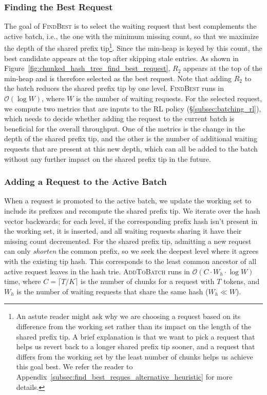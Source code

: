 \vspace{-5pt}

\subsubsection*{Finding the Best Request}
The goal of \textsc{FindBest} is to select the waiting request that best complements the active batch, i.e., the one with the minimum missing count, so that we maximize the depth of the shared prefix tip\footnote{An astute reader might ask why we are choosing a request based on its difference from the working set rather than its impact on the length of the shared prefix tip. A brief explanation is that we want to pick a request that helps us revert back to a longer shared prefix tip sooner, and a request that differs from the working set by the least number of chunks helps us achieve this goal best. We refer the reader to Appendix~\ref{subsec:find_best_reques_alternative_heuristic} for more details.}. Since the min-heap is keyed by this count, the best candidate appears at the top after skipping stale entries. As shown in Figure~\ref{fig:chunked_hash_tree_find_best_request}, $R_2$ appears at the top of the min-heap and is therefore selected as the best request. Note that adding $R_2$ to the batch reduces the shared prefix tip by one level. \textsc{FindBest} runs in $\mathcal{O}(\log W)$, where $W$ is the number of waiting requests. For the selected request, we compute two metrics that are inputs to the RL policy (\S\ref{subsec:batching_rl}), which needs to decide whether adding the request to the current batch is beneficial for the overall throughput. One of the metrics is the change in the depth of the shared prefix tip, and the other is the number of additional waiting requests that are present at this new depth, which can all be added to the batch without any further impact on the shared prefix tip in the future. 

\vspace{-5pt}

\subsubsection*{Adding a Request to the Active Batch} 
When a request is promoted to the active batch, we update the working set to include its prefixes and recompute the shared prefix tip. We iterate over the hash vector backwards; for each level, if the corresponding prefix hash isn't present in the working set, it is inserted, and all waiting requests sharing it have their missing count decremented. For the shared prefix tip, admitting a new request can only \textit{shorten} the common prefix, so we seek the deepest level where it agrees with the existing tip hash. This corresponds to the least common ancestor of all active request leaves in the hash trie. \textsc{AddToBatch} runs in $\mathcal{O}(C \cdot W_h \cdot \log W)$ time, where $C = \lceil T/K \rceil$ is the number of chunks for a request with $T$ tokens, and $W_h$ is the number of waiting requests that share the same hash ($W_h \ll W$).

